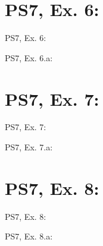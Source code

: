 \section{PS7, Ex. 6: }

\begin{frame}{PS7, Ex. 6: }
  \begin{multicols}{2}
    \vfill\null \columnbreak
    \vfill\null
  \end{multicols}
\end{frame}

\begin{frame}{PS7, Ex. 6.a: }
  \begin{multicols}{2}
    \vfill\null \columnbreak
    \vfill\null
  \end{multicols}
\end{frame}



\section{PS7, Ex. 7: }

\begin{frame}{PS7, Ex. 7: }
  \begin{multicols}{2}
    \vfill\null \columnbreak
    \vfill\null
  \end{multicols}
\end{frame}

\begin{frame}{PS7, Ex. 7.a: }
  \begin{multicols}{2}
    \vfill\null \columnbreak
    \vfill\null
  \end{multicols}
\end{frame}



\section{PS7, Ex. 8: }

\begin{frame}{PS7, Ex. 8: }
  \begin{multicols}{2}
    \vfill\null \columnbreak
    \vfill\null
  \end{multicols}
\end{frame}

\begin{frame}{PS7, Ex. 8.a: }
  \begin{multicols}{2}
    \vfill\null \columnbreak
    \vfill\null
  \end{multicols}
\end{frame}



